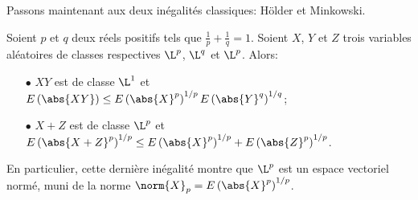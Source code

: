 Passons maintenant aux deux inégalités classiques: Hölder et Minkowski.

\begin{prop}
Soient $p$ et $q$ deux réels positifs tels que $\frac{1}{p} + \frac{1}{q} = 1$. Soient $X$, $Y$ et $Z$ trois variables aléatoires de classes respectives $\L^p$, $\L^q$ et $\L^p$. Alors:
\begin{itemize}
\item[$\bullet$] 
$XY$ est de classe $\L^1$ et $E\left ( \abs{XY}\right ) \leq E\left (\abs{X}^p\right )^{1/p} E\left (\abs{Y}^q\right )^{1/q}$;
\item[$\bullet$] 
$X+Z$ est de classe $\L^p$ et $E\left ( \abs{X+Z}^p\right )^{1/p} \leq E\left (\abs{X}^p\right )^{1/p} + E\left (\abs{Z}^p\right )^{1/p}$.
\end{itemize}

En particulier, cette dernière inégalité montre que $\L^p$ est un espace vectoriel normé, muni de la norme $\norm{X}_p = E\left (\abs{X}^p\right )^{1/p}$.
\end{prop}

